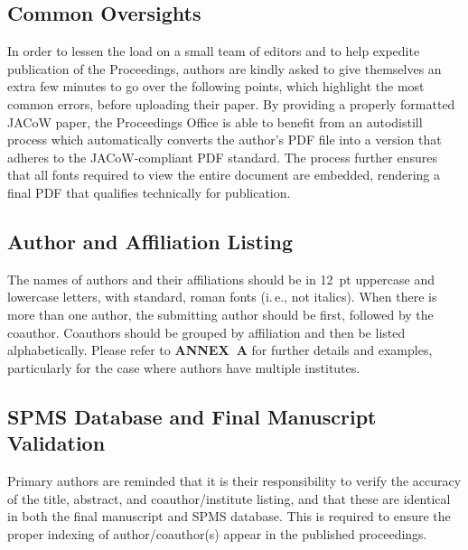 \newpage

\flushcolsend

\subsection{Common Oversights}

In order to lessen the load on a small team of editors
and to help expedite publication of the Proceedings, authors
are kindly asked to give themselves an extra few
minutes to go over the following points, which highlight
the most common errors, before uploading their paper. By
providing a properly formatted JACoW paper, the Proceedings
Office is able to benefit from an autodistill process
which automatically converts the author's PDF file
into a version that adheres to the JACoW-compliant PDF
standard. The process further ensures that all fonts required
to view the entire document are embedded, rendering
a final PDF that qualifies technically for publication.


\subsection{Author and Affiliation Listing}

The names of authors and their affiliations should be in
\SI{12}{pt} uppercase and lowercase letters, with standard,
roman fonts (i.\,e., not italics). When there is more than
one author, the submitting author should be first, followed
by the coauthor. Coauthors should be grouped by affiliation
and then be listed alphabetically. Please refer to \textbf{ANNEX~A}
for further details and examples, particularly for
the case where authors have multiple institutes.

\subsection{SPMS Database and Final Manuscript Validation}

Primary authors are reminded that it is their
responsibility to verify the accuracy of the title, abstract,
and coauthor/institute listing, and that these are identical
in both the final manuscript and SPMS database. This is
required to ensure the proper indexing of author/coauthor(s) 
appear in the published proceedings.

